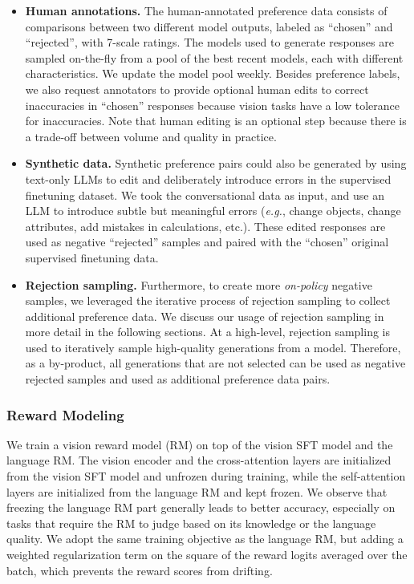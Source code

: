 \begin{itemize}

\item \textbf{Human annotations.} The human-annotated preference data consists of comparisons between two different model outputs, labeled as ``chosen'' and ``rejected'', with 7-scale ratings. The models used to generate responses are sampled on-the-fly from a pool of the best recent models, each with different characteristics. We update the model pool weekly. Besides preference labels, we also request annotators to provide optional human edits to correct inaccuracies in ``chosen'' responses because vision tasks have a low tolerance for inaccuracies. Note that human editing is an optional step because there is a trade-off between volume and quality in practice.

\item \textbf{Synthetic data.} Synthetic preference pairs could also be generated by using text-only LLMs to edit and deliberately introduce errors in the supervised finetuning dataset. We took the conversational data as input, and use an LLM to introduce subtle but meaningful errors (\textit{e.g.}, change objects, change attributes, add mistakes in calculations, etc.). These edited responses are used as negative ``rejected'' samples and paired with the ``chosen'' original supervised finetuning data.

\item \textbf{Rejection sampling.} Furthermore, to create more \emph{on-policy} negative samples, we leveraged the iterative process of rejection sampling to collect additional preference data. We discuss our usage of rejection sampling in more detail in the following sections. At a high-level, rejection sampling is used to iteratively sample high-quality generations from a model. Therefore, as a by-product, all generations that are not selected can be used as negative rejected samples and used as additional preference data pairs.

\end{itemize}

\subsubsection{Reward Modeling}
\label{subsubsection:vision_reward_modeling}
We train a vision reward model (RM) on top of the vision SFT model and the language RM. The vision encoder and the cross-attention layers are initialized from the vision SFT model and unfrozen during training, while the self-attention layers are initialized from the language RM and kept frozen. We observe that freezing the language RM part generally leads to better accuracy, especially on tasks that require the RM to judge based on its knowledge or the language quality. We adopt the same training objective as the language RM, but adding a weighted regularization term on the square of the reward logits averaged over the batch, which prevents the reward scores from drifting.

